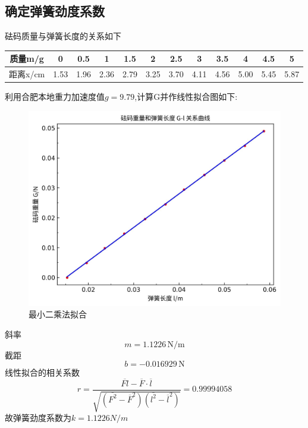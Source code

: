 \documentclass[12pt,a4paper,oneside]{ctexart}
\begin{document}
\subsection{确定弹簧劲度系数}
砝码质量与弹簧长度的关系如下
\begin{center}
    \begin{tabular}{|c|c|c|c|c|c|c|c|c|c|c|c|}
    \hline
    质量m/g&0&0.5&1&1.5&2&2.5&3&3.5&4&4.5&5\\
    \hline
    距离x/cm&1.53&1.96&2.36&2.79&3.25&3.70&4.11&4.56&5.00&5.45&5.87\\
    \hline
    \end{tabular}
\end{center}
利用合肥本地重力加速度值$g=9.79$,计算G并作线性拟合图如下:
\begin{figure}[H]
    \centering
    \includegraphics[scale=0.8]{最小二乘法拟合.jpg}
    \caption{最小二乘法拟合}
\end{figure}
\noindent
斜率
$$
m=1.1226\,\mathrm{N/m}
$$
截距
$$
b=-0.016929\,\mathrm{N}
$$
线性拟合的相关系数
$$
r=\frac{\overline{Fl}-\overline{F}\cdot\overline{l}}{\sqrt{\left(\overline{F^2}-\overline{F}^2\right)\left(\overline{l^2}-\overline{l}^2\right)}}=0.99994058
$$
故弹簧劲度系数为$k=1.1226N/m$
\end{document}
